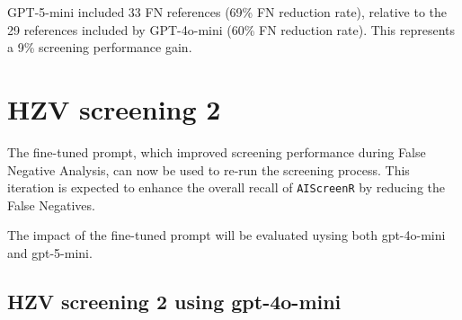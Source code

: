 \documentclass[
  letterpaper,
  DIV=11,
  numbers=noendperiod]{scrartcl}
\newenvironment{Shaded}{\begin{snugshade}}{\end{snugshade}}
\newcommand{\CommentTok}[1]{\textcolor[rgb]{0.37,0.37,0.37}{#1}}
\newcommand{\FunctionTok}[1]{\textcolor[rgb]{0.28,0.35,0.67}{#1}}
\newcommand{\NormalTok}[1]{\textcolor[rgb]{0.00,0.23,0.31}{#1}}
\newcommand{\OtherTok}[1]{\textcolor[rgb]{0.00,0.23,0.31}{#1}}
\newcommand{\SpecialCharTok}[1]{\textcolor[rgb]{0.37,0.37,0.37}{#1}}
\newcommand{\StringTok}[1]{\textcolor[rgb]{0.13,0.47,0.30}{#1}}
\begin{document}
\begin{Shaded}
\end{Shaded}

GPT-5-mini included 33 FN references (69\% FN reduction rate), relative
to the 29 references included by GPT-4o-mini (60\% FN reduction rate).
This represents a 9\% screening performance gain.

\section{\texorpdfstring{\textbf{HZV screening
2}}{HZV screening 2}}\label{hzv-screening-2}

The fine-tuned prompt, which improved screening performance during False
Negative Analysis, can now be used to re-run the screening process. This
iteration is expected to enhance the overall recall of
\texttt{AIScreenR} by reducing the False Negatives.

The impact of the fine-tuned prompt will be evaluated uysing both
gpt-4o-mini and gpt-5-mini.

\subsection{HZV screening 2 using
gpt-4o-mini}\label{hzv-screening-2-using-gpt-4o-mini}
\end{document}
